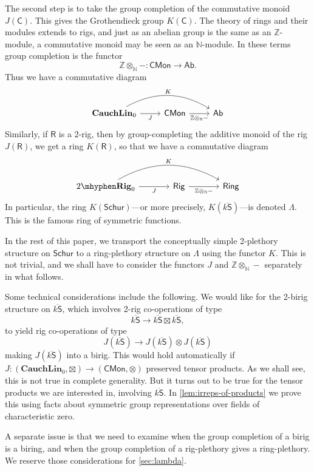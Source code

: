 \documentclass[12pt,reqno]{amsart}
\theoremstyle{plain}
\theoremstyle{definition}
\theoremstyle{remark}
\newcommand{\maps}{\colon}
\newcommand{\category}[1]{\mathsf{#1}}
\newcommand{\C}{\category C}
\newcommand{\N}{\mathbb N}
\newcommand{\R}{\category R}
\renewcommand{\S}{\category S}
\newcommand{\Z}{\mathbb Z}
\newcommand{\namedcat}[1]{\mathsf{#1}}
\newcommand{\Ab}{\namedcat{Ab}}
\newcommand{\CMon}{\namedcat{CMon}}
\newcommand{\Rig}{\namedcat{Rig}}
\newcommand{\Ring}{\namedcat{Ring}}
\newcommand{\Schur}{\namedcat{Schur}}
\newcommand{\TRig}{2\mhyphen\namedbicat{Rig}}
\newcommand{\namedbicat}[1]{\mathbf{#1}}
\newcommand{\Lin}{\namedbicat{Lin}}
\newcommand{\Cauch}{\namedbicat{Cauch}}
\newcommand{\ksbar}{\overline{k\S}}
\numberwithin{thm}{section}
\begin{document}
The second step is to take the group completion of the commutative monoid $J(\C)$. This gives the Grothendieck group $K(\C)$. The theory of rings and their modules extends to rigs, and just as an abelian group is the same as an $\Z$-module, a commutative monoid may be seen as an $\N$-module. In these terms group completion is the functor 
\[
\Z \otimes_\N - \maps \CMon \to \Ab.
\]
Thus we have a commutative diagram
\[
\begin{tikzcd}
    \Cauch\Lin_0
    \arrow[r, swap, "J"] \arrow[rr, bend left, "K"]
    &
    \CMon 
    \arrow[r, swap, "\Z \otimes_\N -"]
    &
    \Ab
\end{tikzcd}
\]
Similarly, if $\R$ is a 2-rig, then by group-completing the additive monoid of the rig $J(\R)$, we get a ring $K(\R)$, so that we have a commutative diagram
\[
\begin{tikzcd}[column sep = large]
    \TRig_0
    \arrow[r, swap, "J"] 
    \arrow[rr, bend left, "K"]
    & 
    \Rig
    \arrow[r, swap, "\Z \otimes_\N -"]
    &
    \Ring
\end{tikzcd}
\]
In particular, the ring $K(\Schur)$---or more precisely, $K(\ksbar)$---is denoted $\Lambda$. This is the famous ring of symmetric functions. 

In the rest of this paper, we transport the conceptually simple 2-plethory structure on $\Schur$ to a ring-plethory structure on $\Lambda$ using the functor $K$. This is not trivial, and we shall have to consider the functors $J$ and $\Z \otimes_\N -$ separately in what follows. 

Some technical considerations include the following. We would like for the 2-birig structure on $\overline{k \S}$, which involves 2-rig co-operations of type 
\[
    \overline{k \S} \to \overline{k \S} \boxtimes \overline{k \S}, 
\]
to yield rig co-operations of type
\[
    J(\overline{k \S}) \to J(\overline{k \S}) \otimes J(\overline{k \S})
\]
making $J(\overline{k \S})$ into a birig. This would hold automatically if $J \maps (\Cauch\Lin_0, \boxtimes) \to (\CMon, \otimes)$ preserved tensor products. As we shall see, this is not true in complete generality. But it turns out to be true for the tensor products we are interested in, involving $\overline{k \S}$. In \cref{lem:irreps-of-products} we prove this using facts about symmetric group representations over fields of characteristic zero. 

A separate issue is that we need to examine when the group completion of a birig is a biring, and when the group completion of a rig-plethory gives a ring-plethory. We reserve those considerations for \cref{sec:lambda}.
\end{document}
